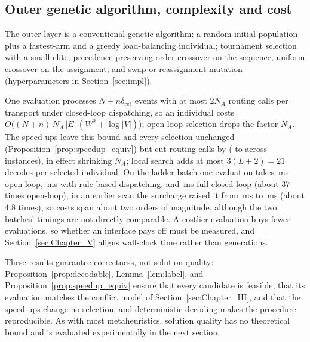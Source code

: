 \subsection{Outer genetic algorithm, complexity and cost}

The outer layer is a conventional genetic algorithm: a random initial population plus a fastest-arm and a greedy load-balancing individual; tournament selection with a small elite; precedence-preserving order crossover on the sequence, uniform crossover on the assignment; and swap or reassignment mutation (hyperparameters in Section~\ref{sec:impl}).

One evaluation processes $N+n\delta_{\mathrm{ret}}$ events with at most $2N_A$ routing calls per transport under closed-loop dispatching, so an individual costs $O\bigl((N+n)\,N_A\,|E|\,(W^{2}+\log|V|)\bigr)$; open-loop selection drops the factor $N_A$.
The speed-ups leave this bound and every selection unchanged (Proposition~\ref{prop:speedup_equiv}) but cut routing calls by \RouteCallCut{} (\RouteCallCutLo{} to \RouteCallCutHi{} across instances), in effect shrinking $N_A$; local search adds at most $3(L+2)=21$ decodes per selected individual.
On the ladder batch one evaluation takes \MsOpen{}\,ms open-loop, \MsLoopRule{}\,ms with rule-based dispatching, and \MsLoopProbe{}\,ms full closed-loop (about $37$ times open-loop); in an earlier scan the surcharge raised it from \MsPricedRef{}\,ms to \MsPriced{}\,ms (about $4.8$ times), so costs span about two orders of magnitude, although the two batches' timings are not directly comparable.
A costlier evaluation buys fewer evaluations, so whether an interface pays off must be measured, and Section~\ref{sec:Chapter_V} aligns wall-clock time rather than generations.

These results guarantee correctness, not solution quality: Proposition~\ref{prop:decodable}, Lemma~\ref{lem:label}, and Proposition~\ref{prop:speedup_equiv} ensure that every candidate is feasible, that its evaluation matches the conflict model of Section~\ref{sec:Chapter_III}, and that the speed-ups change no selection, and deterministic decoding makes the procedure reproducible.
As with most metaheuristics, solution quality has no theoretical bound and is evaluated experimentally in the next section.
